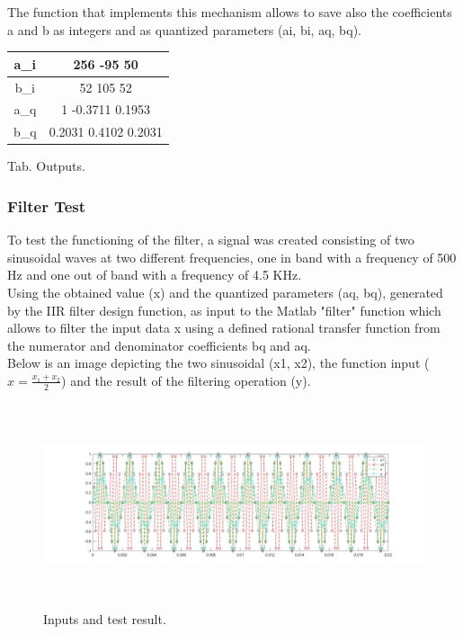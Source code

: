 The function that implements this mechanism allows to save also the coefficients a and b as integers and as quantized parameters (ai, bi, aq, bq).

\begin{center}
    \begin{tabular}{ |c|c| } 
        \hline
            a_i & 256 -95 50\\
            \hline
            b_i & 52 105 52\\
            \hline
            a_q & 1 -0.3711 0.1953\\
            \hline
            b_q & 0.2031 0.4102 0.2031\\
        \hline
    \end{tabular}
    \begin{center}
    Tab. Outputs.
    \end{center}
\end{center}

\subsubsection{Filter Test}

To test the functioning of the filter, a signal was created consisting of two sinusoidal waves at two different frequencies, one in band with a frequency of 500 Hz and one out of band with a frequency of 4.5 KHz.\\
Using the obtained value (x) and the quantized parameters (aq, bq), generated by the IIR filter design function, as input to the Matlab "filter" function which allows to filter the input data x using a defined rational transfer function from the numerator and denominator coefficients bq and aq.\\
Below is an image depicting the two sinusoidal (x1, x2), the function input (\( x = \frac{x_1 + x_2}{2}\)) and the result of the filtering operation (y).

\begin{figure}[H]
	\centering
	\includegraphics[width=\textwidth, height=6cm]{img/test.jpg} 
	\caption{Inputs and test result.}
	\label{fig:Inputs and test result} 
\end{figure}

